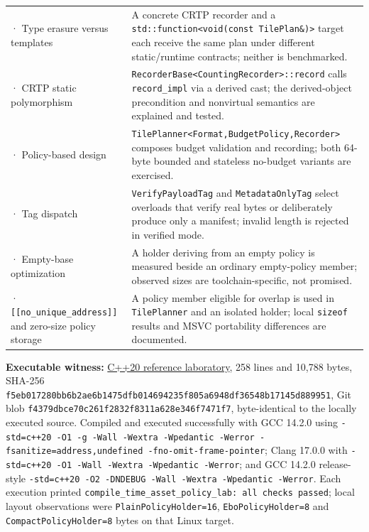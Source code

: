 {\begin{longtable}[]{@{}
  >{\raggedright\arraybackslash}p{}
  >{\raggedright\arraybackslash}p{}@{}}
225 · Type erasure versus templates & A concrete CRTP recorder and a \texttt{std::function\textless{}void(const\ TilePlan\&)\textgreater{}} target each receive the same plan under different static/runtime contracts; neither is benchmarked. \\
226 · CRTP static polymorphism & \texttt{RecorderBase\textless{}CountingRecorder\textgreater{}::record} calls \texttt{record\_impl} via a derived cast; the derived-object precondition and nonvirtual semantics are explained and tested. \\
227 · Policy-based design & \texttt{TilePlanner\textless{}Format,BudgetPolicy,Recorder\textgreater{}} composes budget validation and recording; both 64-byte bounded and stateless no-budget variants are exercised. \\
228 · Tag dispatch & \texttt{VerifyPayloadTag} and \texttt{MetadataOnlyTag} select overloads that verify real bytes or deliberately produce only a manifest; invalid length is rejected in verified mode. \\
229 · Empty-base optimization & A holder deriving from an empty policy is measured beside an ordinary empty-policy member; observed sizes are toolchain-specific, not promised. \\
230 · \texttt{{[}{[}no\_unique\_address{]}{]}} and zero-size policy storage & A policy member eligible for overlap is used in \texttt{TilePlanner} and an isolated holder; local \texttt{sizeof} results and MSVC portability differences are documented. \\
\end{longtable}
}

\textbf{Executable witness:} \href{tools/labs/compile_time_asset_policy_lab.cpp}{C++20 reference laboratory}, 258 lines and 10,788 bytes, SHA-256 \texttt{f5eb017280bb6b2ae6b1475dfb014694235f805a6948df36548b17145d889951}, Git blob \texttt{f4379dbce70c261f2832f8311a628e346f7471f7}, byte-identical to the locally executed source. Compiled and executed successfully with GCC 14.2.0 using \texttt{-std=c++20\ -O1\ -g\ -Wall\ -Wextra\ -Wpedantic\ -Werror\ -fsanitize=address,undefined\ -fno-omit-frame-pointer}; Clang 17.0.0 with \texttt{-std=c++20\ -O1\ -Wall\ -Wextra\ -Wpedantic\ -Werror}; and GCC 14.2.0 release-style \texttt{-std=c++20\ -O2\ -DNDEBUG\ -Wall\ -Wextra\ -Wpedantic\ -Werror}. Each execution printed \texttt{compile\_time\_asset\_policy\_lab:\ all\ checks\ passed}; local layout observations were \texttt{PlainPolicyHolder=16}, \texttt{EboPolicyHolder=8} and \texttt{CompactPolicyHolder=8} bytes on that Linux target.

